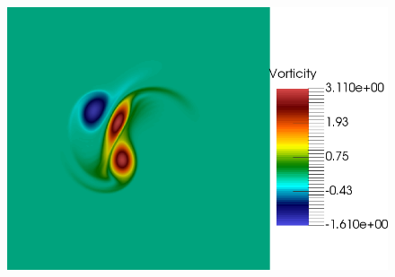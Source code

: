 \begin{figure}[h!]
\includegraphics[scale=0.06]{data/Incompressible_Euler/Snapshots/Full_3.png}\\


\end{figure}
